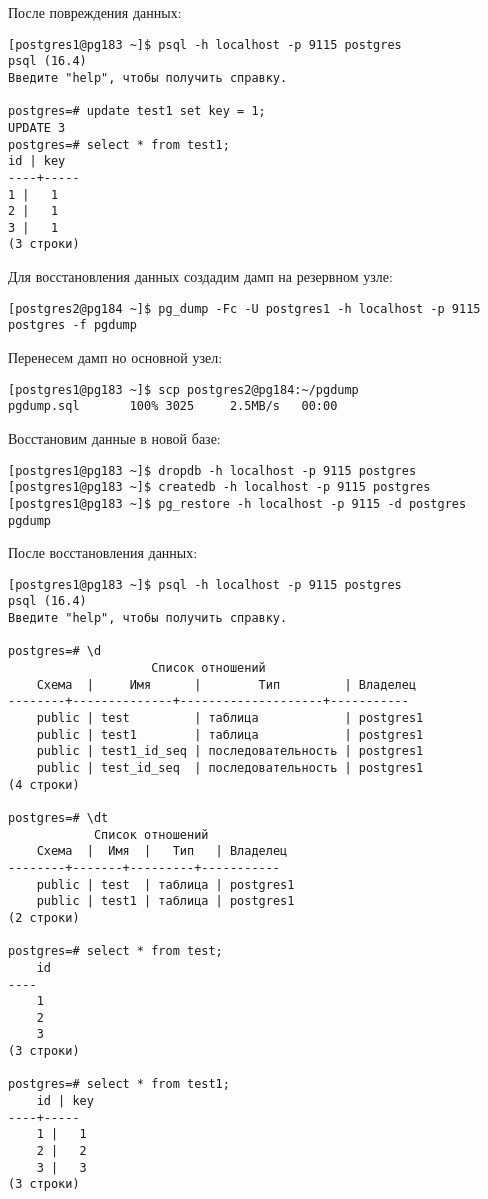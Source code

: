 После повреждения данных:
\begin{verbatim}
[postgres1@pg183 ~]$ psql -h localhost -p 9115 postgres
psql (16.4)
Введите "help", чтобы получить справку.

postgres=# update test1 set key = 1;
UPDATE 3
postgres=# select * from test1;
id | key
----+-----
1 |   1
2 |   1
3 |   1
(3 строки)
\end{verbatim}

Для восстановления данных создадим дамп на резервном узле:

\begin{verbatim}
[postgres2@pg184 ~]$ pg_dump -Fc -U postgres1 -h localhost -p 9115 postgres -f pgdump
\end{verbatim}

Перенесем дамп но основной узел:

\begin{verbatim}
[postgres1@pg183 ~]$ scp postgres2@pg184:~/pgdump
pgdump.sql       100% 3025     2.5MB/s   00:00
\end{verbatim}

Восстановим данные в новой базе:

\begin{verbatim}
[postgres1@pg183 ~]$ dropdb -h localhost -p 9115 postgres
[postgres1@pg183 ~]$ createdb -h localhost -p 9115 postgres
[postgres1@pg183 ~]$ pg_restore -h localhost -p 9115 -d postgres pgdump
\end{verbatim}

После восстановления данных:

\begin{verbatim}
[postgres1@pg183 ~]$ psql -h localhost -p 9115 postgres
psql (16.4)
Введите "help", чтобы получить справку.

postgres=# \d
                    Список отношений
    Схема  |     Имя      |        Тип         | Владелец
--------+--------------+--------------------+-----------
    public | test         | таблица            | postgres1
    public | test1        | таблица            | postgres1
    public | test1_id_seq | последовательность | postgres1
    public | test_id_seq  | последовательность | postgres1
(4 строки)

postgres=# \dt
            Список отношений
    Схема  |  Имя  |   Тип   | Владелец
--------+-------+---------+-----------
    public | test  | таблица | postgres1
    public | test1 | таблица | postgres1
(2 строки)

postgres=# select * from test;
    id
----
    1
    2
    3
(3 строки)

postgres=# select * from test1;
    id | key
----+-----
    1 |   1
    2 |   2
    3 |   3
(3 строки)
\end{verbatim}